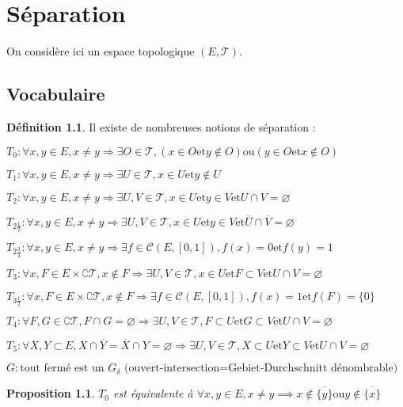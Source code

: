 \documentclass[a4paper, 11pt, french]{book}
\newenvironment{itemise}{\itemize}{\enditemize}
\theoremstyle{plain} %
\newtheorem{proposition}{Proposition}
\theoremstyle{definition} %
\newtheorem{definition}{Définition}
\theoremstyle{remark} %
\newcommand{\1}{\mathds{1}}
\newcommand\vide{\varnothing}
\newcommand{\et}{\mathrel{\mathrm{et}}}
\newcommand{\ou}{\mathrel{\mathrm{ou}}}
\renewcommand{\cal}[1]{\mathcal{#1}}
\newcommand{\scr}[1]{\mathscr{#1}}
\begin{document}
\chapter{Séparation}

On considère ici un espace topologique $(E, \scr{T})$.

\section{Vocabulaire}

\begin{definition}
	Il existe de nombreuses notions de séparation :
	\begin{itemise}
		\item $T_0:\forall x, y\in E, x\neq y\Rightarrow\exists O\in\scr{T}, (x\in O\et y\notin O)\ou(y\in O\et x\notin O)$
		\item $T_1:\forall x, y\in E, x\neq y\Rightarrow\exists U\in\scr{T}, x\in U\et y\notin U$
		\item $T_2:\forall x, y\in E, x\neq y\Rightarrow\exists U, V\in\scr{T}, x\in U\et y\in V\et U\cap V=\vide$
		\item $T_{2\frac{1}{2}}:\forall x, y\in E, x\neq y\Rightarrow\exists U, V\in\scr{T}, x\in U\et y\in V\et\overline{U}\cap\overline{V}=\vide$
		\item $T_{2\frac{3}{4}}:\forall x, y\in E, x\neq y\Rightarrow\exists f\in\cal{C}(E, [0, 1]), f(x)=0\et f(y)=1$
		\item $T_3:\forall x, F\in E\times\complement\scr{T}, x\notin F\Rightarrow\exists U, V\in\scr{T}, x\in U\et F\subset V\et U\cap V=\vide$
		\item $T_{3\frac{1}{2}}:\forall x, F\in E\times\complement\scr{T}, x\notin F\Rightarrow\exists f\in\mathcal{C}(E, [0, 1]), f(x)=1\et f(F)=\{0\}$
		\item $T_4:\forall F, G\in\complement\scr{T}, F\cap G=\vide\Rightarrow\exists U, V\in\scr{T}, F\subset U\et G\subset V\et U\cap V=\vide$
		\item $T_5:\forall X, Y\subset E, X\cap\overline{Y}=\overline{X}\cap Y=\vide\Rightarrow\exists U, V\in\scr{T}, X\subset U\et Y\subset V\et U\cap V=\vide$
		\item $G:\text{tout fermé est un $G_\delta$ (ouvert-intersection=Gebiet-Durchschnitt dénombrable)}$
	\end{itemise}
\end{definition}

\begin{proposition}
	$T_0$ est équivalente à $\forall x, y\in E, x\neq y\implies x\notin\overline{\{y\}}\ou y\notin\overline{\{x\}}$
\end{proposition}
\end{document}
